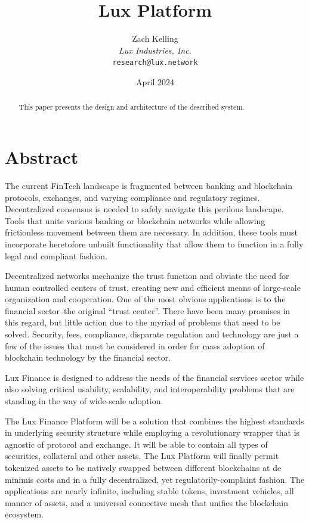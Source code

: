 \documentclass[11pt]{article}
\title{Lux Platform}
\author{Zach Kelling\\\textit{Lux Industries, Inc.}\\\texttt{research@lux.network}}
\date{April 2024}
\begin{document}
\luxcoverpage

\begin{abstract}
This paper presents the design and architecture of the described system.
\end{abstract}

\tableofcontents
\newpage


\section{Abstract}

The current FinTech landscape is fragmented between banking and blockchain protocols, exchanges, and varying compliance and regulatory regimes. Decentralized consensus is needed to safely navigate this perilous landscape. Tools that unite various banking or blockchain networks while allowing frictionless movement between them are necessary. In addition, these tools must incorporate heretofore unbuilt functionality that allow them to function in a fully legal and compliant fashion.


Decentralized networks mechanize the trust function and obviate the need for human controlled centers of trust, creating new and efficient means of large-scale organization and cooperation. One of the most obvious applications is to the financial sector--the original ``trust center''. There have been many promises in this regard, but little action due to the myriad of problems that need to be solved. Security, fees, compliance, disparate regulation and technology are just a few of the issues that must be considered in order for mass adoption of blockchain technology by the financial sector.


Lux Finance is designed to address the needs of the financial services sector while also solving critical usability, scalability, and interoperability problems that are standing in the way of wide-scale adoption.


The Lux Finance Platform will be a solution that combines the highest standards in underlying security structure while employing a revolutionary wrapper that is agnostic of protocol and exchange. It will be able to contain all types of securities, collateral and other assets. The Lux Platform will finally permit tokenized assets to be natively swapped between different blockchains at de minimis costs and in a fully decentralized, yet regulatorily-complaint fashion. The applications are nearly infinite, including stable tokens, investment vehicles, all manner of assets, and a universal connective mesh that unifies the blockchain ecosystem.
\end{document}
